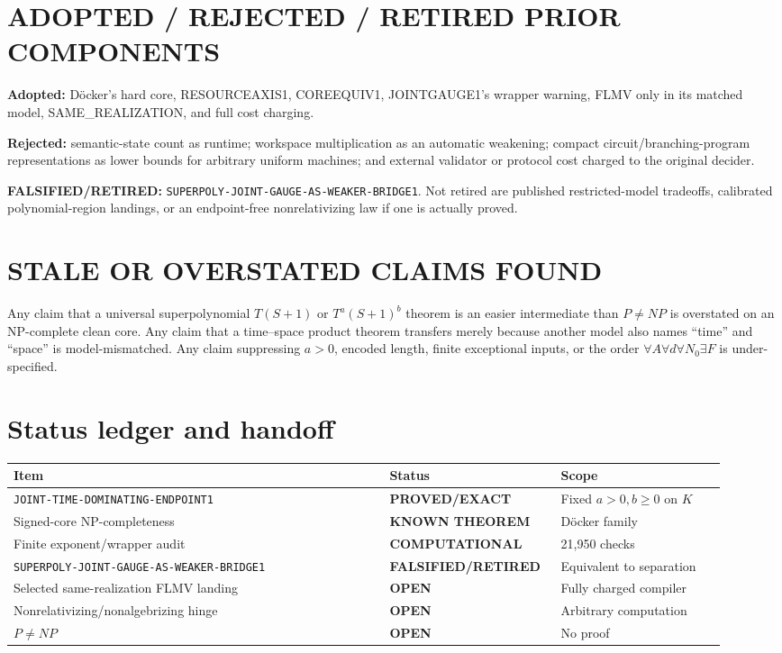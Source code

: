 \documentclass[11pt]{article}
\newcommand{\EXACT}{\textbf{PROVED/EXACT}}
\newcommand{\KNOWN}{\textbf{KNOWN THEOREM}}
\newcommand{\COMP}{\textbf{COMPUTATIONAL}}
\newcommand{\OPEN}{\textbf{OPEN}}
\newcommand{\RETIRED}{\textbf{FALSIFIED/RETIRED}}
\begin{document}
\section{ADOPTED / REJECTED / RETIRED PRIOR COMPONENTS}

\textbf{Adopted:} D\"ocker's hard core, RESOURCEAXIS1, COREEQUIV1,
JOINTGAUGE1's wrapper warning, FLMV only in its matched model,
SAME\_REALIZATION, and full cost charging.

\textbf{Rejected:} semantic-state count as runtime; workspace multiplication
as an automatic weakening; compact circuit/branching-program representations
as lower bounds for arbitrary uniform machines; and external validator or
protocol cost charged to the original decider.

\textbf{FALSIFIED/RETIRED:}
\texttt{SUPERPOLY-JOINT-GAUGE-AS-WEAKER-BRIDGE1}.  Not retired are published
restricted-model tradeoffs, calibrated polynomial-region landings, or an
endpoint-free nonrelativizing law if one is actually proved.

\section{STALE OR OVERSTATED CLAIMS FOUND}

Any claim that a universal superpolynomial $T(S+1)$ or $T^a(S+1)^b$ theorem is
an easier intermediate than $P\ne NP$ is overstated on an NP-complete clean
core.  Any claim that a time--space product theorem transfers merely because
another model also names ``time'' and ``space'' is model-mismatched.  Any
claim suppressing $a>0$, encoded length, finite exceptional inputs, or the
order $\forall A\forall d\forall N_0\exists F$ is under-specified.

\section{Status ledger and handoff}

\begin{center}\small
\begin{tabular}{@{}p{0.50\linewidth}p{0.20\linewidth}p{0.22\linewidth}@{}}
\toprule
Item & Status & Scope\\ \midrule
\texttt{JOINT-TIME-DOMINATING-ENDPOINT1} & \EXACT & Fixed $a>0,b\ge0$ on $K$\\
Signed-core NP-completeness & \KNOWN & D\"ocker family\\
Finite exponent/wrapper audit & \COMP & 21,950 checks\\
\texttt{SUPERPOLY-JOINT-GAUGE-AS-WEAKER-BRIDGE1} & \RETIRED & Equivalent to separation\\
Selected same-realization FLMV landing & \OPEN & Fully charged compiler\\
Nonrelativizing/nonalgebrizing hinge & \OPEN & Arbitrary computation\\
$P\ne NP$ & \OPEN & No proof\\
\bottomrule
\end{tabular}
\end{center}
\end{document}
